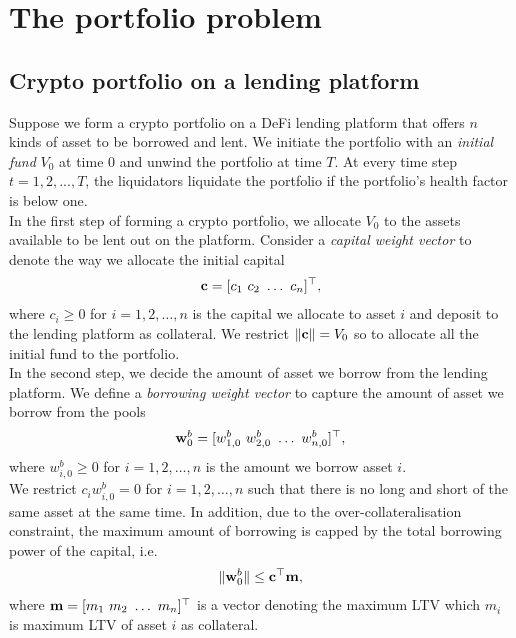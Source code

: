 \documentclass{article} %
\theoremstyle{plain}
\theoremstyle{definition} %
\begin{document}
\section{The portfolio problem}
\subsection{Crypto portfolio on a lending platform}
Suppose we form a crypto portfolio on a DeFi lending platform that offers $n$ kinds of asset to be borrowed and lent. 
 We initiate the portfolio with an \textit{initial fund} $V_0$ at time $0$ and unwind the portfolio at time $T$.
 At every time step $t=1,2,...,T$, the liquidators liquidate the portfolio if the portfolio's health factor is below one.\\

In the first step of forming a crypto portfolio, we allocate $V_0$ to the assets available to be lent out on the platform. 
Consider a \textit{capital weight vector} to denote the way we allocate the initial capital
\begin{align*}
  {\bf c} = [c_1\ c_2\ \dots\ c_n]^\top,
\end{align*}
where $c_i \geq 0$ for $i=1,2,\dots,n$ is the capital we allocate to asset $i$ and deposit to the lending platform as collateral.
We restrict $\|{\bf c}\| = V_0$ so to allocate all the initial fund to the portfolio. \\

In the second step, we decide the amount of asset we borrow from the lending platform.
We define a \textit{borrowing weight vector} to capture the amount of asset we borrow from the pools
\begin{align*}
  {\bf w}^b_0 = [w_{1,0}^b\ w_{2,0}^b\ \dots\ w^b_{n,0}]^\top,
\end{align*}
where $w^b_{i,0} \geq 0$ for $i=1,2,\dots,n$ is the amount we borrow asset $i$. \\ 

We restrict $c_iw^b_{i,0} = 0$ for $i=1,2,\dots,n$ such that there is no long and short of the same asset at the same time.
In addition, due to the over-collateralisation constraint, the maximum amount of borrowing is capped by the total borrowing power of the capital, i.e.
 \begin{align*}
  \|{\bf w}^b_0\| \leq {\bf c}^\top {\bf m},
  \end{align*}
where ${\bf m} = [m_1\ m_2\ \dots\ m_n]^\top$ is a vector denoting the maximum LTV which $m_i$ is maximum LTV of asset $i$ as collateral. \\
\end{document}
